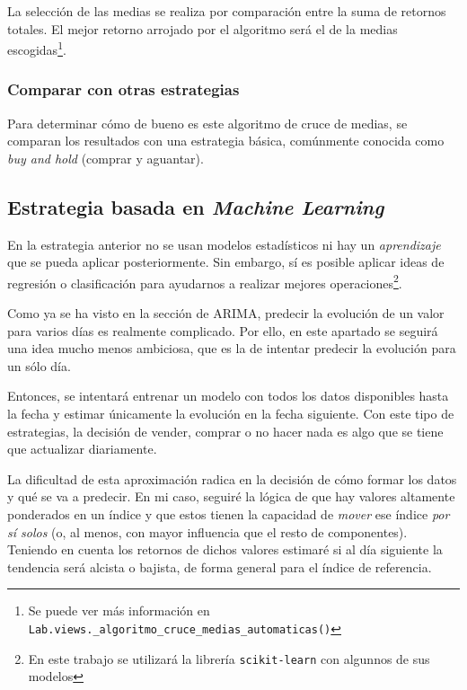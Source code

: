 La selección de las medias se realiza por comparación entre la suma de retornos totales. El mejor retorno arrojado por el algoritmo será el de la medias escogidas\footnote{Se puede ver más información en \texttt{Lab.views.\_algoritmo\_cruce\_medias\_automaticas()}}. 


\subsubsection{Comparar con otras estrategias}

Para determinar cómo de bueno es este algoritmo de cruce de medias, se comparan los resultados con una estrategia básica, comúnmente conocida como \emph{buy and hold} (comprar y aguantar)\citep{wiki:buy_and_hold}.


\subsection{Estrategia basada en \emph{Machine Learning}}

En la estrategia anterior no se usan modelos estadísticos ni hay un \emph{aprendizaje} que se pueda aplicar posteriormente. Sin embargo, sí es posible aplicar ideas de regresión o clasificación para ayudarnos a realizar mejores operaciones\footnote{En este trabajo se utilizará la librería \texttt{scikit-learn} con algunnos de sus modelos}. 

Como ya se ha visto en la sección de ARIMA, predecir la evolución de un valor para varios días es realmente complicado. Por ello, en este apartado se seguirá una idea mucho menos ambiciosa, que es la de intentar predecir la evolución para un sólo día. 

Entonces, se intentará entrenar un modelo con todos los datos disponibles hasta la fecha y estimar únicamente la evolución en la fecha siguiente. Con este tipo de estrategias, la decisión de vender, comprar o no hacer nada es algo que se tiene que actualizar diariamente.

La dificultad de esta aproximación radica en la decisión de cómo formar los datos y qué se va a predecir. En mi caso, seguiré la lógica de que hay valores altamente ponderados en un índice y que estos tienen la capacidad de \emph{mover} ese índice \emph{por sí solos} (o, al menos, con mayor influencia que el resto de componentes). Teniendo en cuenta los retornos de dichos valores estimaré si al día siguiente la tendencia será alcista o bajista, de forma general para el índice de referencia. 

